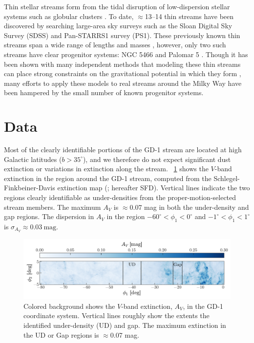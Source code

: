 \documentclass[modern]{aastex62}
\newcommand{\msun}{\rm M_\odot}
\begin{document}
Thin stellar streams form from the tidal disruption of low-dispersion stellar systems such as globular clusters \citep[e.g.,][]{TODO}. To date, $\approx$13--14 thin streams have been discovered by searching large-area sky surveys such as the Sloan Digital Sky Survey (SDSS) and Pan-STARRS1 survey (PS1). These previously known thin streams span a wide range of lengths \citep[$\sim2$--$60$ deg;][]{bernard14,grillmair06} and masses \citep[$\sim10^3$--$10^5~\msun$;][]{TODO,TODO}, however, only two such streams have clear progenitor systems: NGC 5466 and Palomar 5 \citep{TODO,TODO}. Though it has been shown with many independent methods that modeling these thin streams can place strong constraints on the gravitational potential in which they form \citep{apw14,TODO}, many efforts to apply these models to real streams around the Milky Way have been hampered by the small number of known progenitor systems.


\section{Data}
\label{sec:data}


Most of the clearly identifiable portions of the GD-1 stream are located at high
Galactic latitudes ($b > 35^\circ$), and we therefore do not expect significant
dust extinction or variations in extinction along the stream.
\figurename~\ref{fig:sfd} shows the $V$-band extinction in the region around the
GD-1 stream, computed from the Schlegel-Finkbeiner-Davis extinction map
(\cite{Schlegel:1998}; hereafter SFD).
Vertical lines indicate the two regions clearly identifiable as under-densities
from the proper-motion-selected stream members.
The maximum $A_V$ is $\approx$0.07 mag in both the under-density and gap
regions.
The dispersion in $A_V$ in the region $-60^\circ < \phi_1 < 0^\circ$ and
$-1^\circ < \phi_1 < 1^\circ$ is $\sigma_{A_V} \approx 0.03~\textrm{mag}$.

\begin{figure}[h]
\begin{center}
\includegraphics[width=\textwidth]{sfd.pdf}
\end{center}
\caption{%
Colored background shows the $V$-band extinction, $A_V$, in the GD-1
coordinate system.
Vertical lines roughly show the extents the identified under-density (UD) and
gap.
The maximum extinction in the UD or Gap regions is $\approx$0.07 mag.
\label{fig:sfd}
}
\end{figure}
\end{document}
